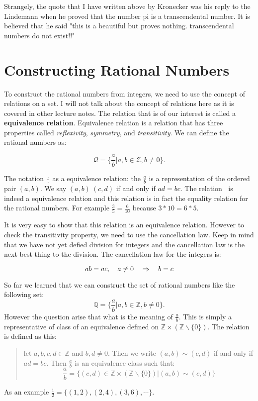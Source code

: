 Strangely, the quote that I have written above by Kronecker was his reply to the Lindemann when he proved that the number pi is a transcendental number. It is believed that he said "this is a beautiful but proves nothing. transcendental numbers do not exist!!"


\section{Constructing Rational Numbers}

To construct the rational numbers from integers, we need to use the concept of relations on a set. I will not talk about the concept of relations here as it is covered in other lecture notes. The relation that is of our interest is called a \textbf{equivalence relation}. Equivalence relation is a relation that has three properties called \textit{reflexivity}, \textit{symmetry}, and \textit{transitivity}. We can define the rational numbers as:

\[ \mathcal{Q} = \{ \frac{a}{b} | a,b \in \mathcal{Z}, b \neq 0 \}. \]

The notation $ \frac{\cdot}{\cdot} $ as a equivalence relation: the $ \frac{a}{b} $ is a representation of the ordered pair $ (a,b) $. We say $ (a,b) ~ (c,d) $ if and only if $ ad = bc $. The relation $ ~ $ is indeed a equivalence relation and this relation is in fact the equality relation for the rational numbers. For example $ \frac{3}{5} = \frac{6}{10} $ because $ 3*10 = 6*5 $.

It is very easy to show that this relation is an equivalence relation. However to check the transitivity property, we need to use the cancellation law. Keep in mind that we have not yet defied division for integers and the cancellation law is the next best thing to the division. The cancellation law for the integers is:

\[ ab = ac, \quad a \neq 0 \quad \Rightarrow \quad b=c \]



So far we learned that we can construct the set of rational numbers like the following set:
\[ \mathbb{Q} = \{ \frac{a}{b} | a,b \in \mathbb{Z}, b \neq 0 \}. \]
However the question arise that what is the meaning of $ \frac{a}{b} $. This is simply a representative of class of an equivalence defined on $ \mathbb{Z} \times (\mathbb{Z}\backslash\{0\})$. The relation is defined as this:
\begin{quote}
	let $ a,b,c,d \in \mathbb{Z} $ and $ b,d \neq 0 $. Then we write $ (a,b) \sim (c,d) $ if and only if $ ad = bc $. Then $ \frac{a}{b} $ is an equivalence class such that: \[ \frac{a}{b} = \{ (c,d) \in \mathbb{Z} \times (\mathbb{Z}\backslash\{0\}) | (a,b) \sim (c,d) \} \]
\end{quote}
As an example $ \frac{1}{2} = \{ (1,2), (2,4), (3,6), \cdots \} $.

